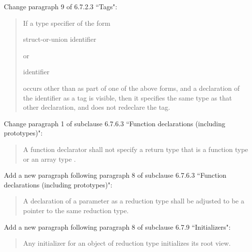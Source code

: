 Change paragraph 9 of 6.7.2.3 ``Tags":

\begin{quote}
If a type specifier of the form

\begin{bnf}
struct-or-union identifier
\end{bnf}


\begin{bnf}
 
\end{bnf}

or

\begin{bnf}
 identifier
\end{bnf}

occurs other than as part of one of the above forms,
and a declaration of the identifier as a tag is visible,
then it specifies the same type as that other declaration,
and does not redeclare the tag.
\end{quote}

Change paragraph 1 of subclause 6.7.6.3
``Function declarations (including prototypes)":

\begin{quote}
A function declarator shall not specify a return type
that is a function type or an array type
.
\end{quote}

Add a new paragraph following paragraph 8 of subclause 6.7.6.3
``Function declarations (including prototypes)":

\begin{quote}
A declaration of a parameter as a reduction type
shall be adjusted to be a pointer to the same reduction type.
\end{quote}

Add a new paragraph following paragraph 8
of subclause 6.7.9 ``Initializers":

\begin{quote}
Any initializer for an object of reduction type initializes its root view.
\end{quote}

